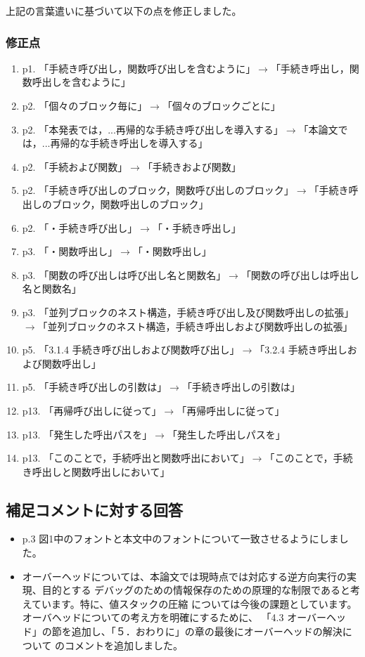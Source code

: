 \documentclass[a4j]{jarticle}
\begin{document}
上記の言葉遣いに基づいて以下の点を修正しました。
\subsubsection*{修正点}
\begin{enumerate}
\item p1. 「手続き呼び出し，関数呼び出しを含むように」$\rightarrow$「手続き呼出し，関数呼出しを含むように」
\item p2. 「個々のブロック毎に」$\rightarrow$「個々のブロックごとに」
\item p2. 「本発表では，...再帰的な手続き呼び出しを導入する」$\rightarrow$「本論文では，...再帰的な手続き呼出しを導入する」
\item p2. 「手続および関数」$\rightarrow$「手続きおよび関数」
\item p2. 「手続き呼び出しのブロック，関数呼び出しのブロック」$\rightarrow$「手続き呼出しのブロック，関数呼出しのブロック」
\item p2. 「・手続き呼び出し」$\rightarrow$「・手続き呼出し」
\item p3. 「・関数呼出し」$\rightarrow$「・関数呼出し」
\item p3. 「関数の呼び出しは呼び出し名と関数名」$\rightarrow$「関数の呼び出しは呼出し名と関数名」
\item p3. 「並列ブロックのネスト構造，手続き呼び出し及び関数呼出しの拡張」$\rightarrow$「並列ブロックのネスト構造，手続き呼出しおよび関数呼出しの拡張」
\item p5. 「3.1.4  手続き呼び出しおよび関数呼び出し」$\rightarrow$「3.2.4  手続き呼出しおよび関数呼出し」
\item p5. 「手続き呼び出しの引数は」$\rightarrow$「手続き呼出しの引数は」
\item p13. 「再帰呼び出しに従って」$\rightarrow$「再帰呼出しに従って」
\item p13. 「発生した呼出パスを」$\rightarrow$「発生した呼出しパスを」
\item p13. 「このことで，手続呼出と関数呼出において」$\rightarrow$「このことで，手続き呼出しと関数呼出しにおいて」
\end{enumerate}

\subsection*{補足コメントに対する回答}
\begin{itemize}
\item p.3 図1中のフォントと本文中のフォントについて一致させるようにしました。
\item オーバーヘッドについては、本論文では現時点では対応する逆方向実行の実現、目的とする
デバッグのための情報保存のための原理的な制限であると考えています。特に、値スタックの圧縮
については今後の課題としています。オーバヘッドについての考え方を明確にするために、
「4.3 オーバーヘッド」の節を追加し、「５．おわりに」の章の最後にオーバーヘッドの解決について
のコメントを追加しました。
\end{itemize}
\end{document}
